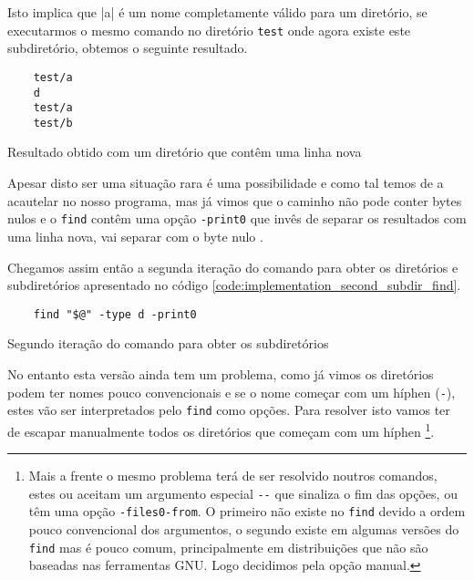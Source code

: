 Isto implica que \bashinline|a\nd| é um nome completamente válido para um diretório,
se executarmos o mesmo comando no diretório \Verb|test| onde agora existe este
subdiretório, obtemos o seguinte resultado.

\begin{listing}[H]
	\centering
	\begin{verbatim}
    test/a
    d
    test/a
    test/b
  \end{verbatim}
	\caption{Resultado obtido com um diretório que contêm uma linha nova}
\end{listing}

Apesar disto ser uma situação rara é uma possibilidade e como tal temos de a
acautelar no nosso programa, mas já vimos que o caminho não pode conter bytes
nulos e o \Verb|find| contêm uma opção \Verb|-print0| que invês de separar os
resultados com uma linha nova, vai separar com o byte nulo \cite{find_man}.

Chegamos assim então a segunda iteração do comando para obter os diretórios e
subdiretórios apresentado no código \ref{code:implementation_second_subdir_find}.

\begin{listing}[H]
	\centering
	\begin{verbatim}
    find "$@" -type d -print0
  \end{verbatim}
	\caption{Segundo iteração do comando para obter os subdiretórios}
	\label{code:implementation_second_subdir_find}
\end{listing}

No entanto esta versão ainda tem um problema, como já vimos os diretórios podem
ter nomes pouco convencionais e se o nome começar com um híphen (\Verb|-|),
estes vão ser interpretados pelo \Verb|find| como opções. Para resolver isto
vamos ter de escapar manualmente todos os diretórios que começam com um híphen
\footnote{Mais a frente o mesmo problema terá de ser resolvido noutros comandos,
	estes ou aceitam um argumento especial \Verb|--| que sinaliza o fim das opções,
	ou têm uma opção \Verb|-files0-from|. O primeiro não existe no \Verb|find|
	devido a ordem pouco convencional dos argumentos, o segundo existe em algumas
	versões do \Verb|find| mas é pouco comum, principalmente em distribuições que
	não são baseadas nas ferramentas GNU. Logo decidimos pela opção manual.}.

